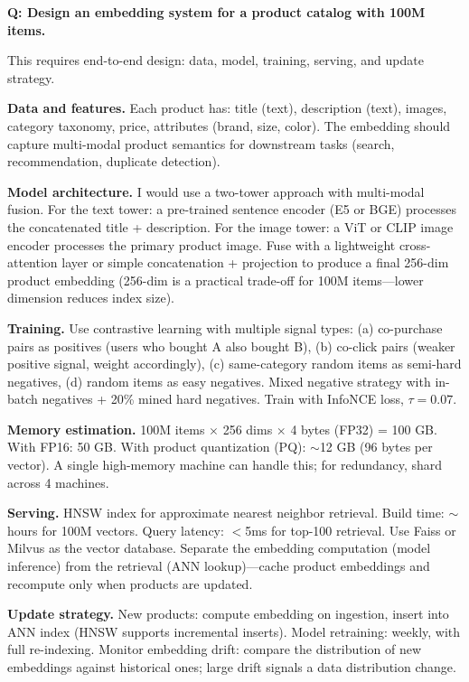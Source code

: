 \begin{interviewq}
\textbf{Q: Design an embedding system for a product catalog with 100M items.}

 \quad {} \quad \badgefreq{\freqhigh}

\stronganswer

This requires end-to-end design: data, model, training, serving, and update strategy.

\textbf{Data and features.} Each product has: title (text), description (text), images, category taxonomy, price, attributes (brand, size, color). The embedding should capture multi-modal product semantics for downstream tasks (search, recommendation, duplicate detection).

\textbf{Model architecture.} I would use a two-tower approach with multi-modal fusion. For the text tower: a pre-trained sentence encoder (E5 or BGE) processes the concatenated title + description. For the image tower: a ViT or CLIP image encoder processes the primary product image. Fuse with a lightweight cross-attention layer or simple concatenation + projection to produce a final 256-dim product embedding (256-dim is a practical trade-off for 100M items---lower dimension reduces index size).

\textbf{Training.} Use contrastive learning with multiple signal types: (a) co-purchase pairs as positives (users who bought A also bought B), (b) co-click pairs (weaker positive signal, weight accordingly), (c) same-category random items as semi-hard negatives, (d) random items as easy negatives. Mixed negative strategy with in-batch negatives + 20\% mined hard negatives. Train with InfoNCE loss, $\tau = 0.07$.

\textbf{Memory estimation.} 100M items $\times$ 256 dims $\times$ 4 bytes (FP32) = 100 GB. With FP16: 50 GB. With product quantization (PQ): $\sim$12 GB (96 bytes per vector). A single high-memory machine can handle this; for redundancy, shard across 4 machines.

\textbf{Serving.} HNSW index for approximate nearest neighbor retrieval. Build time: $\sim$hours for 100M vectors. Query latency: $<$5ms for top-100 retrieval. Use Faiss or Milvus as the vector database. Separate the embedding computation (model inference) from the retrieval (ANN lookup)---cache product embeddings and recompute only when products are updated.

\textbf{Update strategy.} New products: compute embedding on ingestion, insert into ANN index (HNSW supports incremental inserts). Model retraining: weekly, with full re-indexing. Monitor embedding drift: compare the distribution of new embeddings against historical ones; large drift signals a data distribution change.


\end{interviewq}
